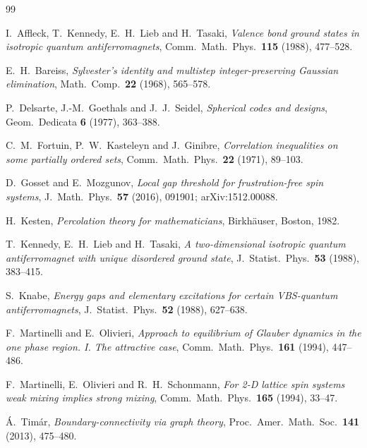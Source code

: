\documentclass[11pt,reqno]{amsart}
\theoremstyle{plain}
\theoremstyle{definition}
\theoremstyle{remark}
\numberwithin{equation}{section}
\begin{document}
\begin{thebibliography}{99}

I.~Affleck, T.~Kennedy, E.~H.~Lieb and H.~Tasaki,
\emph{Valence bond ground states in isotropic quantum antiferromagnets},
Comm.\ Math.\ Phys.\ \textbf{115} (1988), 477--528.

E.~H.~Bareiss,
\emph{Sylvester's identity and multistep integer-preserving Gaussian elimination},
Math.\ Comp.\ \textbf{22} (1968), 565--578.

P.~Delsarte, J.-M.~Goethals and J.~J.~Seidel,
\emph{Spherical codes and designs},
Geom.\ Dedicata \textbf{6} (1977), 363--388.

C.~M.~Fortuin, P.~W.~Kasteleyn and J.~Ginibre,
\emph{Correlation inequalities on some partially ordered sets},
Comm.\ Math.\ Phys.\ \textbf{22} (1971), 89--103.

D.~Gosset and E.~Mozgunov,
\emph{Local gap threshold for frustration-free spin systems},
J.\ Math.\ Phys.\ \textbf{57} (2016), 091901; arXiv:1512.00088.

H.~Kesten,
\emph{Percolation theory for mathematicians},
Birkh\"auser, Boston, 1982.

T.~Kennedy, E.~H.~Lieb and H.~Tasaki,
\emph{A two-dimensional isotropic quantum antiferromagnet with unique disordered ground state},
J.\ Statist.\ Phys.\ \textbf{53} (1988), 383--415.

S.~Knabe,
\emph{Energy gaps and elementary excitations for certain VBS-quantum antiferromagnets},
J.\ Statist.\ Phys.\ \textbf{52} (1988), 627--638.

F.~Martinelli and E.~Olivieri,
\emph{Approach to equilibrium of Glauber dynamics in the one phase region. I. The attractive case},
Comm.\ Math.\ Phys.\ \textbf{161} (1994), 447--486.

F.~Martinelli, E.~Olivieri and R.~H.~Schonmann,
\emph{For 2-D lattice spin systems weak mixing implies strong mixing},
Comm.\ Math.\ Phys.\ \textbf{165} (1994), 33--47.

\'A.~Tim\'ar,
\emph{Boundary-connectivity via graph theory},
Proc.\ Amer.\ Math.\ Soc.\ \textbf{141} (2013), 475--480.

\end{thebibliography}
\end{document}
